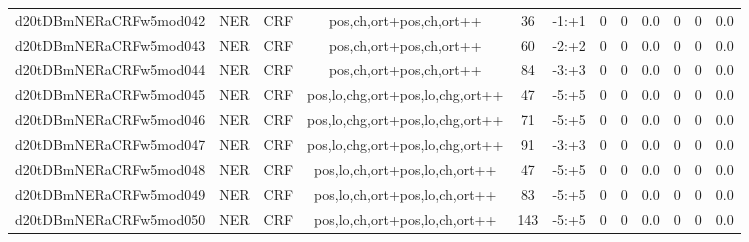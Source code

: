 \documentclass[a4paper]{article}
\begin{document}
\begin{landscape}
\begin{center}
\begin{tabular}{ |c|c|c|c|c|c|c|c|c|c|c|c|}
 
 	
 	\small{ d20tDBmNERaCRFw5mod042 } & \small{ NER} & \small{  CRF }  & pos,ch,ort+pos,ch,ort++  &  36 &  \small{  -1:+1 }  &  0 & 0 & 0.0  &  0 & 0 & 0.0 \\
 	

 
 	
 	\small{ d20tDBmNERaCRFw5mod043 } & \small{ NER} & \small{  CRF }  & pos,ch,ort+pos,ch,ort++  &  60 &  \small{  -2:+2 }  &  0 & 0 & 0.0  &  0 & 0 & 0.0 \\
 	

 
 	
 	\small{ d20tDBmNERaCRFw5mod044 } & \small{ NER} & \small{  CRF }  & pos,ch,ort+pos,ch,ort++  &  84 &  \small{  -3:+3 }  &  0 & 0 & 0.0  &  0 & 0 & 0.0 \\
 	

 
 	
 	\small{ d20tDBmNERaCRFw5mod045 } & \small{ NER} & \small{  CRF }  & pos,lo,chg,ort+pos,lo,chg,ort++  &  47 &  \small{  -5:+5 }  &  0 & 0 & 0.0  &  0 & 0 & 0.0 \\
 	

 
 	
 	\small{ d20tDBmNERaCRFw5mod046 } & \small{ NER} & \small{  CRF }  & pos,lo,chg,ort+pos,lo,chg,ort++  &  71 &  \small{  -5:+5 }  &  0 & 0 & 0.0  &  0 & 0 & 0.0 \\
 	

 
 	
 	\small{ d20tDBmNERaCRFw5mod047 } & \small{ NER} & \small{  CRF }  & pos,lo,chg,ort+pos,lo,chg,ort++  &  91 &  \small{  -3:+3 }  &  0 & 0 & 0.0  &  0 & 0 & 0.0 \\
 	

 
 	
 	\small{ d20tDBmNERaCRFw5mod048 } & \small{ NER} & \small{  CRF }  & pos,lo,ch,ort+pos,lo,ch,ort++  &  47 &  \small{  -5:+5 }  &  0 & 0 & 0.0  &  0 & 0 & 0.0 \\
 	

 
 	
 	\small{ d20tDBmNERaCRFw5mod049 } & \small{ NER} & \small{  CRF }  & pos,lo,ch,ort+pos,lo,ch,ort++  &  83 &  \small{  -5:+5 }  &  0 & 0 & 0.0  &  0 & 0 & 0.0 \\
 	

 
 	
 	\small{ d20tDBmNERaCRFw5mod050 } & \small{ NER} & \small{  CRF }  & pos,lo,ch,ort+pos,lo,ch,ort++  &  143 &  \small{  -5:+5 }  &  0 & 0 & 0.0  &  0 & 0 & 0.0 \\
 	
 \hline
\end{tabular}
\end{center}





\end{landscape}
\end{document}

